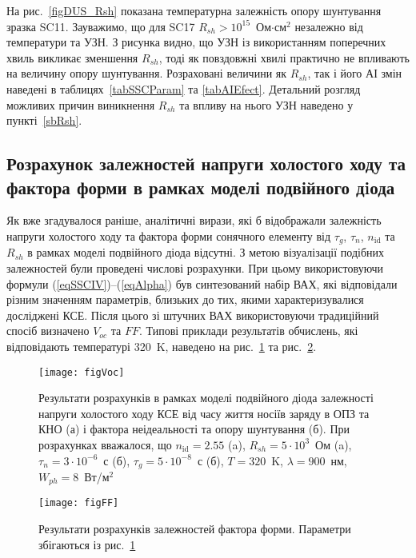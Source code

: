 На рис.~\ref{figDUS_Rsh} показана температурна залежність  опору шунтування зразка SC11.
Зауважимо, що для SC17 $R_{sh}>10^{15}$~Ом$\cdot$см$^2$ незалежно від температури та УЗН.
З рисунка видно, що УЗН із використанням поперечних хвиль викликає зменшення $R_{sh}$,
тоді як повздовжні хвилі практично не впливають на величину  опору шунтування.
Розраховані величини як $R_{sh}$, так і його АІ змін наведені в таблицях~\ref{tabSSCParam} та \ref{tabAIEfect}.
Детальний розгляд можливих причин виникнення $R_{sh}$ та впливу на нього УЗН наведено у пункті~\ref{sbRsh}.


\subsection{Розрахунок залежностей напруги холостого ходу та фактора форми в рамках моделі подвійного дiода\label{sbVocSim}}


Як вже згадувалося раніше,
аналітичні вирази, які б відображали залежність напруги холостого ходу та фактора форми сонячного елементу
від $\tau_g$, $\tau_n$, $n_{\mathrm{id}}$ та $R_{sh}$ в рамках  моделі подвійного діода відсутні.
З метою візуалізації подібних залежностей були проведені числові розрахунки.
При цьому використовуючи
формули (\ref{eqSSCIV})--(\ref{eqAlpha}) був синтезований набір ВАХ, які відповідали різним
значенням параметрів, близьких
до тих, якими характеризувалися досліджені КСЕ.
Після цього зі штучних ВАХ використовуючи традиційний спосіб визначено $V_{oc}$ та $F\!F$.
Типові приклади результатів обчислень, які відповідають температурі 320~K, наведено на рис.~\ref{figVoc} та рис.~\ref{figFF}.


\begin{figure}
\center
\texttt{[image: figVoc]}
\caption{\label{figVoc}
Результати розрахунків
в рамках моделі подвійного діода залежності напруги холостого ходу КСЕ від часу життя носіїв заряду в ОПЗ та КНО (а) і
фактора неідеальності та  опору шунтування (б).
При розрахунках вважалося, що $n_\mathrm{id}=2.55$ (a), $R_{sh}=5\cdot10^3$~Ом (a), $\tau_n=3\cdot10^{-6}$~с (б), $\tau_g=5\cdot10^{-8}$~с (б), $T=320$~K, $\lambda=900$~нм, $W_{ph}=8$~Вт/м$^2$
}%
\end{figure}


\begin{figure}[b]
\center
\texttt{[image: figFF]}
\caption{\label{figFF}
Результати розрахунків залежностей фактора форми.
Параметри збігаються із рис.~\ref{figVoc}
}%
\end{figure}

